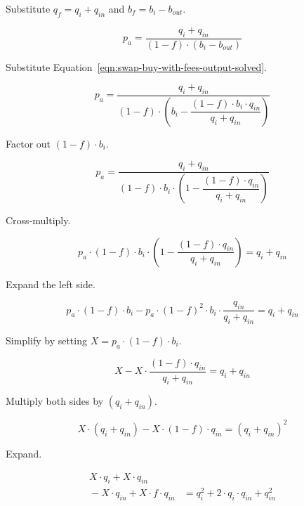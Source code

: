 \documentclass[table, twocolumn]{article}
\begin{document}
Substitute $q_f = q_i + q_{in}$ and $b_f = b_i - b_{out}$.

\begin{equation}
  p_a = \frac{q_i + q_{in}}{(1 - f) \cdot (b_i - b_{out})} \nonumber
\end{equation}

Substitute Equation~\ref{eqn:swap-buy-with-fees-output-solved}.

\begin{equation}
  p_a = \frac{q_i + q_{in}}{(1 - f) \cdot
  \left(b_i - \dfrac{(1 - f) \cdot b_i \cdot q_{in}}{q_i + q_{in}}\right)} \nonumber
\end{equation}

Factor out $(1 - f) \cdot b_i$.

\begin{equation}
  p_a = \frac{q_i + q_{in}}{(1 - f) \cdot b_i \cdot
  \left(1 - \dfrac{(1 - f) \cdot q_{in}}{q_i + q_{in}}\right)} \nonumber
\end{equation}

Cross-multiply.

\begin{equation}
  p_a \cdot (1 - f) \cdot b_i \cdot
  \left(1 - \dfrac{(1 - f) \cdot q_{in}}{q_i + q_{in}}\right) = q_i + q_{in} \nonumber
\end{equation}

Expand the left side.

\begin{equation}
  p_a \cdot (1 - f) \cdot b_i - p_a \cdot {(1 - f)}^2 \cdot b_i \cdot
  \frac{q_{in}}{q_i + q_{in}} = q_i + q_{in} \nonumber
\end{equation}

Simplify by setting $X = p_a \cdot (1 - f) \cdot b_i$.

\begin{equation}
  X - X \cdot \frac{(1 - f) \cdot q_{in}}{q_i + q_{in}} = q_i + q_{in} \nonumber
\end{equation}

Multiply both sides by $(q_i + q_{in})$.

\begin{equation}
  X \cdot (q_i + q_{in}) - X \cdot (1 - f) \cdot q_{in} = (q_i + q_{in})^2 \nonumber
\end{equation}

Expand.

\begin{equation}
  \begin{aligned}
  X \cdot q_i + X \cdot q_{in} & \\
  {}- X \cdot q_{in} + X \cdot f \cdot q_{in} &=
  q_i^2 + 2 \cdot q_i \cdot q_{in} + q_{in}^2 \nonumber
  \end{aligned}
\end{equation}
\end{document}
